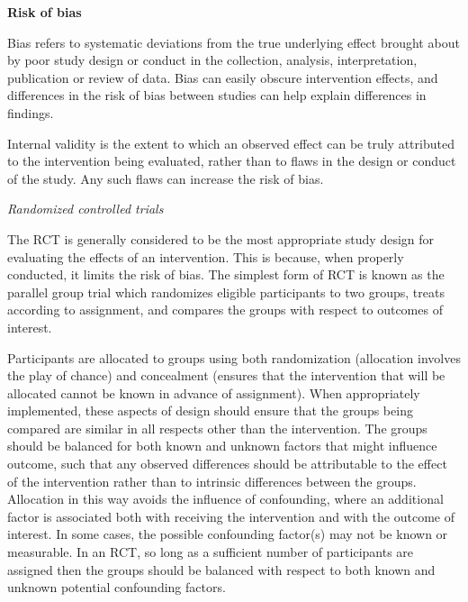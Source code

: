 \documentclass[
  11pt,
  a4paper,
  DIV=11,
  numbers=noendperiod]{scrreprt}
\begin{document}
\textbf{Risk of bias}

Bias refers to systematic deviations from the true underlying effect
brought about by poor study design or conduct in the collection,
analysis, interpretation, publication or review of data. Bias can easily
obscure intervention effects, and differences in the risk of bias
between studies can help explain differences in findings.

Internal validity is the extent to which an observed effect can be truly
attributed to the intervention being evaluated, rather than to flaws in
the design or conduct of the study. Any such flaws can increase the risk
of bias.

\emph{Randomized controlled trials}

The RCT is generally considered to be the most appropriate study design
for evaluating the effects of an intervention. This is because, when
properly conducted, it limits the risk of bias. The simplest form of RCT
is known as the parallel group trial which randomizes eligible
participants to two groups, treats according to assignment, and compares
the groups with respect to outcomes of interest.

Participants are allocated to groups using both randomization
(allocation involves the play of chance) and concealment (ensures that
the intervention that will be allocated cannot be known in advance of
assignment). When appropriately implemented, these aspects of design
should ensure that the groups being compared are similar in all respects
other than the intervention. The groups should be balanced for both
known and unknown factors that might influence outcome, such that any
observed differences should be attributable to the effect of the
intervention rather than to intrinsic differences between the groups.
Allocation in this way avoids the influence of confounding, where an
additional factor is associated both with receiving the intervention and
with the outcome of interest. In some cases, the possible confounding
factor(s) may not be known or measurable. In an RCT, so long as a
sufficient number of participants are assigned then the groups should be
balanced with respect to both known and unknown potential confounding
factors.
\end{document}
